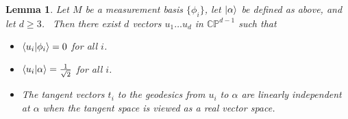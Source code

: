 \documentclass[letterpaper,12pt]{article}
\newtheorem{lem}{Lemma}
\newcommand{\braket}[2]{\mbox{$ \langle #1 | #2 \rangle $}}
\newcommand{\ket}[1]{\mbox{$ | #1 \rangle $}}
\begin{document}
\begin{lem}
\label{ui_lemma}
Let $M$ be a measurement basis $\{\phi_i \}$, let $\ket{\alpha}$ be defined as above, and let $d\geq 3$. \ Then there exist $d$ vectors $u_1 \ldots u_d$ in $\mathbb{CP}^{d-1}$ such that
\begin{itemize}

\item $\braket{u_i}{\phi_i} =0$ for all $i$.

\item $\braket{u_i}{\alpha}=\frac{1}{\sqrt{2}}$ for all $i$.

\item The tangent vectors $t_i$ to the geodesics from $u_i$ to $\alpha$ are linearly independent at $\alpha$ when the tangent space is viewed as a real vector space.

\end{itemize}
\end{lem}
\end{document}
